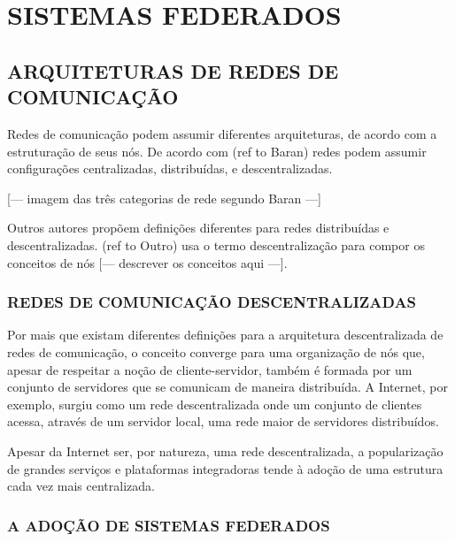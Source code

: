 \part{SISTEMAS FEDERADOS}

\chapter{ARQUITETURAS DE REDES DE COMUNICAÇÃO}


Redes de comunicação podem assumir diferentes arquiteturas, de acordo com a 
estruturação de seus nós. De acordo com (ref to Baran) redes podem assumir
configurações centralizadas, distribuídas, e descentralizadas. 

[--- imagem das três categorias de rede segundo Baran ---]

Outros autores propõem definições diferentes para redes distribuídas e
descentralizadas. (ref to Outro) usa o termo descentralização para compor os
conceitos de nós [--- descrever os conceitos aqui ---]. 


\section{REDES DE COMUNICAÇÃO DESCENTRALIZADAS}

Por mais que existam diferentes definições para a arquitetura descentralizada de
redes de comunicação, o conceito converge para uma organização de nós que, apesar
de respeitar a noção de cliente-servidor, também é formada por um conjunto de
servidores que se comunicam de maneira distribuída. A Internet, por exemplo, surgiu
como um rede descentralizada onde um conjunto de clientes acessa, através de um
servidor local, uma rede maior de servidores distribuídos.

Apesar da Internet ser, por natureza, uma rede descentralizada, a popularização de 
grandes serviços e plataformas integradoras tende à adoção de uma estrutura  cada
vez mais centralizada. %


\section{A ADOÇÃO DE SISTEMAS FEDERADOS}

